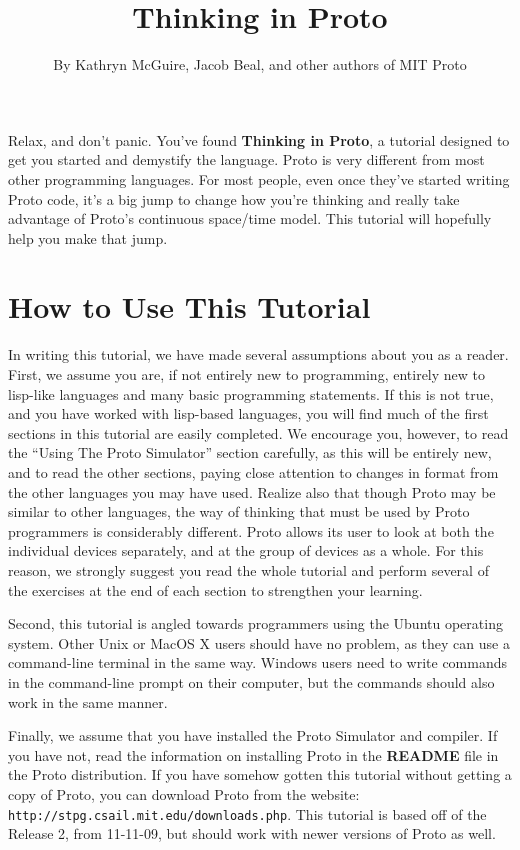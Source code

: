\documentclass{article}
\title{Thinking in Proto}
\author{By Kathryn McGuire, Jacob Beal, and other authors of MIT Proto}
\date{\releasetag}
\begin{document}
\maketitle

Relax, and don't panic.  You've found {\bf Thinking in Proto}, a
tutorial designed to get you started and demystify the language.
Proto is very different from most other programming languages.  For
most people, even once they've started writing Proto code, it's a big
jump to change how you're thinking and really take advantage of
Proto's continuous space/time model.  This tutorial will hopefully
help you make that jump.

\tableofcontents

\credits{}


\section{How to Use This Tutorial}
	
In writing this tutorial, we have made several assumptions about you
as a reader.  First, we assume you are, if not entirely new to
programming, entirely new to lisp-like languages and many basic
programming statements.  If this is not true, and you have worked with
lisp-based languages, you will find much of the first sections in this
tutorial are easily completed.  We encourage you, however, to read the
``Using The Proto Simulator'' section carefully, as this will be
entirely new, and to read the other sections, paying close attention
to changes in format from the other languages you may have used.
Realize also that though Proto may be similar to other languages, the
way of thinking that must be used by Proto programmers is considerably
different.  Proto allows its user to look at both the individual
devices separately, and at the group of devices as a whole.  For this
reason, we strongly suggest you read the whole tutorial and perform
several of the exercises at the end of each section to strengthen your
learning.

Second, this tutorial is angled towards programmers using the Ubuntu
operating system.  Other Unix or MacOS X users should have no problem,
as they can use a command-line terminal in the same way.  Windows
users need to write commands in the command-line prompt on their
computer, but the commands should also work in the same manner.

Finally, we assume that you have installed the Proto Simulator and
compiler.  If you have not, read the information on installing Proto
in the {\bf README} file in the Proto distribution.  If you have
somehow gotten this tutorial without getting a copy of Proto, you can
download Proto from the website: {\tt
  http://stpg.csail.mit.edu/downloads.php}.  This tutorial is based
off of the Release 2, from 11-11-09, but should work with newer versions
of Proto as well.
\end{document}
